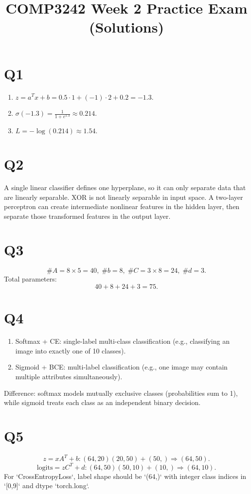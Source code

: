 \documentclass[11pt]{article}
\title{COMP3242 Week 2 Practice Exam (Solutions)}
\date{}
\begin{document}
\maketitle

\section*{Q1}
\begin{enumerate}[label=(\alph*)]
  \item $z=a^Tx+b=0.5\cdot1+(-1)\cdot2+0.2=-1.3$.
  \item $\sigma(-1.3)=\frac{1}{1+e^{1.3}}\approx 0.214$.
  \item $L=-\log(0.214)\approx 1.54$.
\end{enumerate}

\section*{Q2}
A single linear classifier defines one hyperplane, so it can only separate data that are linearly separable. XOR is not linearly separable in input space. A two-layer perceptron can create intermediate nonlinear features in the hidden layer, then separate those transformed features in the output layer.

\section*{Q3}
\[
\#A=8\times5=40,\; \#b=8,\; \#C=3\times8=24,\; \#d=3.
\]
Total parameters:
\[
40+8+24+3=75.
\]

\section*{Q4}
\begin{enumerate}[label=(\alph*)]
  \item Softmax + CE: single-label multi-class classification (e.g., classifying an image into exactly one of 10 classes).
  \item Sigmoid + BCE: multi-label classification (e.g., one image may contain multiple attributes simultaneously).
\end{enumerate}
Difference: softmax models mutually exclusive classes (probabilities sum to 1), while sigmoid treats each class as an independent binary decision.

\section*{Q5}
\[
z = xA^T + b: (64,20)(20,50) + (50,) \Rightarrow (64,50).
\]
\[
\text{logits} = zC^T + d: (64,50)(50,10) + (10,) \Rightarrow (64,10).
\]
For `CrossEntropyLoss`, label shape should be `(64,)` with integer class indices in `[0,9]` and dtype `torch.long`.
\end{document}
